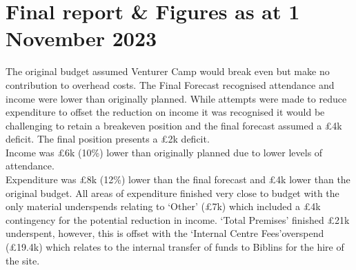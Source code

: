 \section{Final report \& Figures as at 1 November 2023}
The original budget assumed Venturer Camp would break even but make no contribution to overhead costs. The Final Forecast recognised attendance and income were lower than originally planned. While attempts were made to reduce expenditure to offset the reduction on income it was recognised it would be challenging to retain a breakeven position and the final forecast assumed a \pounds4k deficit. The final position presents a \pounds2k deficit.\\

Income was \pounds6k (10\%) lower than originally planned due to lower levels of attendance.\\

Expenditure was \pounds8k (12\%) lower than the final forecast and \pounds4k lower than the original budget. All areas of expenditure finished very close to budget with the only material underspends relating to `Other' (\pounds7k) which included a \pounds4k contingency for the potential reduction in income. `Total Premises' finished \pounds21k underspent, however, this is offset with the `Internal Centre Fees'overspend (\pounds19.4k) which relates to the internal transfer of funds to Biblins for the hire of the site.


